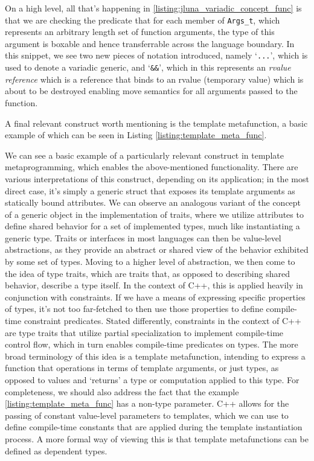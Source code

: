\begin{listing}[ht!]
  
  \caption{Jluna variadic concept function}
  \label{listing:jluna_variadic_concept_func}
\end{listing}

On a high level, all that's happening in \ref{listing:jluna_variadic_concept_func} is that we are checking the predicate that for each member of \texttt{Args\_t}, which represents an arbitrary length set of function arguments, the type of this argument is boxable and hence transferrable across the language boundary. In this snippet, we see two new pieces of notation introduced, namely `\texttt{...}', which is used to denote a variadic generic, and `\texttt{\&\&}', which in this represents an \textit{rvalue reference} which is a reference that binds to an rvalue (temporary value) which is about to be destroyed enabling move semantics for all arguments passed to the function.

A final relevant construct worth mentioning is the template metafunction, a basic example of which can be seen in Listing \ref{listing:template_meta_func}.

We can see a basic example of a particularly relevant construct in template metaprogramming, which enables the above-mentioned functionality. There are various interpretations of this construct, depending on its application; in the most direct case, it's simply a generic struct that exposes its template arguments as statically bound attributes. We can observe an analogous variant of the concept of a generic object in the implementation of traits, where we utilize attributes to define shared behavior for a set of implemented types, much like instantiating a generic type. Traits or interfaces in most languages can then be value-level abstractions, as they provide an abstract or shared view of the behavior exhibited by some set of types. Moving to a higher level of abstraction, we then come to the idea of type traits, which are traits that, as opposed to describing shared behavior, describe a type itself. In the context of C++, this is applied heavily in conjunction with constraints. If we have a means of expressing specific properties of types, it's not too far-fetched to then use those properties to define compile-time constraint predicates. Stated differently, constraints in the context of C++ are type traits that utilize partial specialization to implement compile-time control flow, which in turn enables compile-time predicates on types. The more broad terminology of this idea is a template metafunction, intending to express a function that operations in terms of template arguments, or just types, as opposed to values and `returns' a type or computation applied to this type. For completeness, we should also address the fact that the example \ref{listing:template_meta_func} has a non-type parameter. C++ allows for the passing of constant value-level parameters to templates, which we can use to define compile-time constants that are applied during the template instantiation process. A more formal way of viewing this is that template metafunctions can be defined as dependent types.

